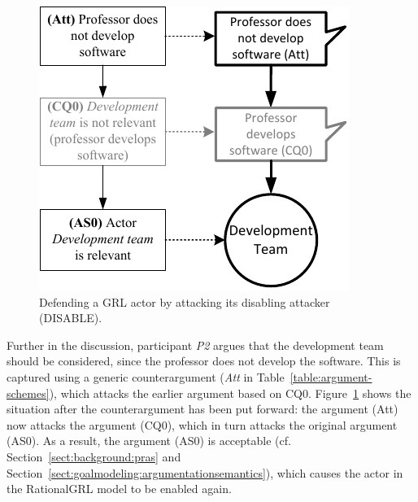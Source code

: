 \begin{figure}[t]
\centering
\includegraphics[]{img/reinstate2.pdf}
\caption{Defending a GRL actor by attacking its disabling attacker (\textsf{DISABLE)}.}
\label{fig:examples:relevant-actor2}
\end{figure}

Further in the discussion, participant \emph{P2} argues that the development team should be considered, since the professor does not develop the software. This is captured using a generic counterargument (\emph{Att} in Table~\ref{table:argument-schemes}), which attacks the earlier argument based on CQ0. Figure~\ref{fig:examples:relevant-actor2} shows the situation after the counterargument has been put forward: the argument (Att) now attacks the argument (CQ0), which in turn attacks the original argument (AS0). As a result, the argument (AS0) is acceptable (cf. Section~\ref{sect:background:pras} and Section~\ref{sect:goalmodeling:argumentationsemantics}), which causes the actor in the RationalGRL model to be enabled again.

